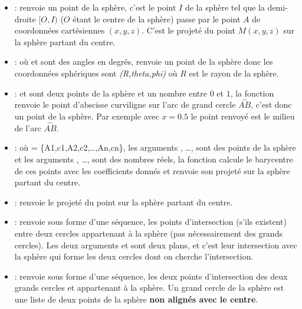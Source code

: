 \begin{itemize}
    \item {} : renvoie un point de la sphère, c'est le point $I$ de la sphère tel que la demi-droite $[O,I)$ ($O$ étant le centre de la sphère) passe par le point $A$ de coordonnées cartésiennes $(x,y,z)$. C'est le projeté du point $M(x,y,z)$ sur la sphère partant du centre.
        
    \item {} : où  et  sont des angles en degrés, renvoie un point de la sphère donc les coordonnées sphériques sont \emph{(R,theta,phi)} où $R$ est le rayon de la sphère.
    
    \item {} :  et  sont deux points de la sphère et  un nombre entre $0$ et $1$, la fonction renvoie le point d'abscisse curviligne  sur l'arc de grand cercle $\overset{\frown}{AB}$, c'est donc un point de la sphère. Par exemple avec $x=0.5$ le point renvoyé est le milieu de l'arc $\overset{\frown}{AB}$.
    
    \item {} : où  = \{A1,c1,A2,c2,\ldots,An,cn\}, les arguments , \ldots, sont des points de la sphère et les arguments , \ldots, sont des nombres réels, la fonction calcule le barycentre de ces points avec les coefficients donnés et renvoie son projeté sur la sphère partant du centre.
        
    \item {} : renvoie le projeté du point  sur la sphère partant du centre.
    
    \item {} : renvoie sous forme d'une séquence, les points d'intersection (s'ils existent) entre deux cercles appartenant à la sphère (pas nécessairement des grands cercles). Les deux arguments  et  sont deux plans, et c'est leur intersection avec la sphère qui forme les deux cercles dont on cherche l'intersection.
    
    \item {} : renvoie sous forme d'une séquence, les deux points d'intersection des deux grands cercles  et  appartenant à la sphère. Un grand cercle de la sphère est une liste de deux points de la sphère \textbf{non alignés avec le centre}.
    

\end{itemize}
